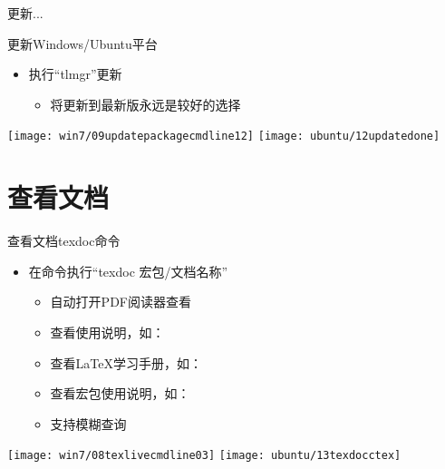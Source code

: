 \documentclass[fontset = none, t]{ctexbeamer}
\begin{document}
\begin{frame}
  更新...
\end{frame}

\begin{frame}{更新\tl}{Windows/Ubuntu平台}
  \begin{spacing}{1.5}
    \begin{itemize}
    \item 执行\enquote{tlmgr}更新\tl %
      \begin{itemize}
      \item 将\tl 更新到最新版永远是较好的选择
      \end{itemize}
    \end{itemize}
    \begin{center}
      \texttt{[image: win7/09updatepackagecmdline12]}
      \texttt{[image: ubuntu/12updatedone]}
    \end{center}
  \end{spacing}
\end{frame}

\section[查看文档]{查看\tl 文档}
\begin{frame}{查看文档}{texdoc命令}
  \begin{spacing}{1.5}
    \begin{itemize}
    \item 在命令执行\enquote{texdoc 宏包/文档名称}%
      \begin{itemize}
      \item 自动打开PDF阅读器查看
      \item 查看\tl 使用说明，如：
      \item 查看\LaTeX 学习手册，如：
      \item 查看宏包使用说明，如：
      \item 支持模糊查询
      \end{itemize}
    \end{itemize}
    \begin{center}
      \texttt{[image: win7/08texlivecmdline03]}
      \texttt{[image: ubuntu/13texdocctex]}
    \end{center}
  \end{spacing}
\end{frame}
\end{document}
